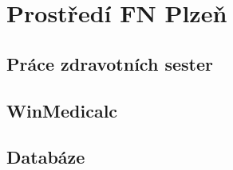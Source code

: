 \setlength{\parskip}{1em}

\chapter{Prostředí FN Plzeň}

\section{Práce zdravotních sester}

\section{WinMedicalc}

\section{Databáze}